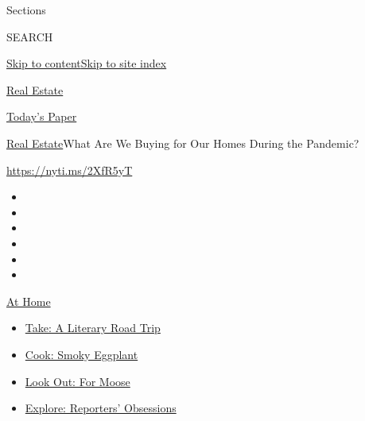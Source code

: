 Sections

SEARCH

\protect\hyperlink{site-content}{Skip to
content}\protect\hyperlink{site-index}{Skip to site index}

\href{https://www.nytimes3xbfgragh.onion/section/realestate}{Real
Estate}

\href{https://myaccount.nytimes3xbfgragh.onion/auth/login?response_type=cookie\&client_id=vi}{}

\href{https://www.nytimes3xbfgragh.onion/section/todayspaper}{Today's
Paper}

\href{/section/realestate}{Real Estate}\textbar{}What Are We Buying for
Our Homes During the Pandemic?

\url{https://nyti.ms/2XfR5yT}

\begin{itemize}
\item
\item
\item
\item
\item
\item
\end{itemize}

\href{https://www.nytimes3xbfgragh.onion/spotlight/at-home?action=click\&pgtype=Article\&state=default\&region=TOP_BANNER\&context=at_home_menu}{At
Home}

\begin{itemize}
\tightlist
\item
  \href{https://www.nytimes3xbfgragh.onion/2020/07/28/books/time-for-a-literary-road-trip.html?action=click\&pgtype=Article\&state=default\&region=TOP_BANNER\&context=at_home_menu}{Take:
  A Literary Road Trip}
\item
  \href{https://www.nytimes3xbfgragh.onion/2020/07/29/magazine/bored-with-your-home-cooking-some-smoky-eggplant-will-fix-that.html?action=click\&pgtype=Article\&state=default\&region=TOP_BANNER\&context=at_home_menu}{Cook:
  Smoky Eggplant}
\item
  \href{https://www.nytimes3xbfgragh.onion/2020/07/27/travel/moose-michigan-isle-royale.html?action=click\&pgtype=Article\&state=default\&region=TOP_BANNER\&context=at_home_menu}{Look
  Out: For Moose}
\item
  \href{https://www.nytimes3xbfgragh.onion/interactive/2020/at-home/even-more-reporters-editors-diaries-lists-recommendations.html?action=click\&pgtype=Article\&state=default\&region=TOP_BANNER\&context=at_home_menu}{Explore:
  Reporters' Obsessions}
\end{itemize}

